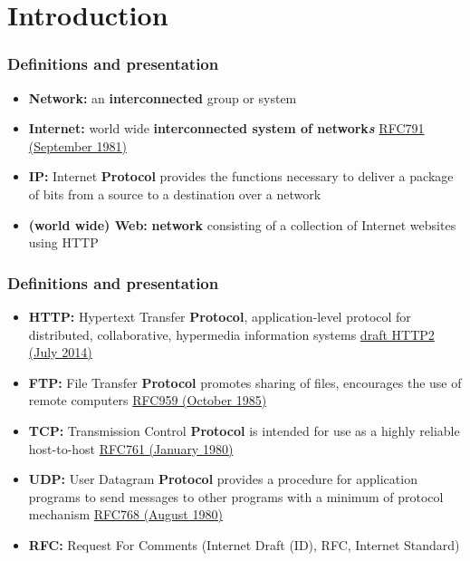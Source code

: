 \section{Introduction}
  \begin{frame}
    \frametitle{Definitions and presentation}
      \begin{itemize}
        \item \textbf{Network:} an \textbf{interconnected} group or system\pause
        \item \textbf{Internet:} world wide \textbf{interconnected system of network\emph{s}} \color{blue}\href{http://tools.ietf.org/html/rfc791}{RFC791 (September 1981)}\color{black}\pause
        \item \textbf{IP:} Internet \textbf{Protocol} provides the functions necessary to deliver a package of bits from a source to a destination over a network\pause
        \item \textbf{(world wide) Web:} \textbf{network} consisting of a collection of Internet websites using HTTP
      \end{itemize}
  \end{frame}
  \begin{frame}
    \frametitle{Definitions and presentation}
      \begin{itemize}
        \item \textbf{HTTP:} Hypertext Transfer \textbf{Protocol}, application-level protocol for distributed, collaborative, hypermedia information systems \color{blue}\href{http://tools.ietf.org/html/draft-ietf-httpbis-http2-14}{draft HTTP2 (July 2014)} \color{black}\pause
        \item \textbf{FTP:} File Transfer \textbf{Protocol} promotes sharing of files, encourages the use of remote computers \color{blue}\href{http://tools.ietf.org/html/rfc959}{RFC959 (October 1985)} \color{black} \pause
        \item \textbf{TCP:} Transmission Control \textbf{Protocol} is intended for use as a highly reliable host-to-host \color{blue}\href{http://tools.ietf.org/html/rfc761}{RFC761 (January 1980)} \color{black} \pause
        \item \textbf{UDP:} User Datagram \textbf{Protocol} provides  a procedure  for application  programs  to send messages  to other programs  with a minimum  of protocol mechanism \color{blue}\href{http://tools.ietf.org/html/rfc768}{RFC768 (August 1980)} \color{black} \pause
        \item \textbf{RFC:} Request For Comments (Internet Draft (ID), RFC, Internet Standard)
      \end{itemize}
  \end{frame}
